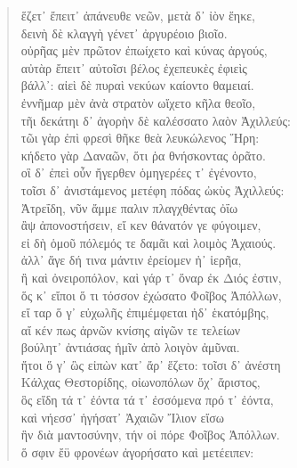 \begin{Spacing}{1.5}
\begin{verse}
{\large\g  ἕζετ᾽ ἔπειτ᾽ ἀπάνευθε νεῶν, μετὰ δ᾽ ἰὸν ἕηκε,  } \\
{\large\g  δεινὴ δὲ κλαγγὴ γένετ᾽ ἀργυρέοιο βιοῖο.  } \\
{\large\g  οὐρῆας μὲν πρῶτον ἐπωίχετο καὶ κύνας ἀργούς,  } \\
{\large\g  αὐτὰρ ἔπειτ᾽ αὐτοῖσι βέλος ἐχεπευκὲς ἐφιεὶς  } \\
{\large\g  βάλλ᾽: αἰεὶ δὲ πυραὶ νεκύων καίοντο θαμειαί.  } \\
{\large\g  ἐννῆμαρ μὲν ἀνὰ στρατὸν ωἴχετο κῆλα θεοῖο,  } \\
{\large\g  τῆι δεκάτηι δ᾽ ἀγορὴν δὲ καλέσσατο λαὸν Ἀχιλλεύς:  } \\
{\large\g  τῶι γὰρ ἐπὶ φρεσὶ θῆκε θεὰ λευκώλενος Ἥρη:  } \\
{\large\g  κήδετο γὰρ Δαναῶν, ὅτι ῥα θνήσκοντας ὁρᾶτο.  } \\
{\large\g  οἳ δ᾽ ἐπεὶ οὖν ἤγερθεν ὁμηγερέες τ᾽ ἐγένοντο,  } \\
{\large\g  τοῖσι δ᾽ ἀνιστάμενος μετέφη πόδας ὠκὺς Ἀχιλλεύς:  } \\
{\large\g  Ἀτρεΐδη, νῦν ἄμμε παλιν πλαγχθέντας ὀΐω  } \\
{\large\g  ἂψ ἀπονοστήσειν, εἴ κεν θάνατόν γε φύγοιμεν,  } \\
{\large\g  εἰ δὴ ὁμοῦ πόλεμός τε δαμᾶι καὶ λοιμὸς Ἀχαιούς.  } \\
{\large\g  ἀλλ᾽ ἄγε δή τινα μάντιν ἐρείομεν ἠ᾽ ἱερῆα,  } \\
{\large\g  ἢ καὶ ὀνειροπόλον, καὶ γάρ τ᾽ ὄναρ ἐκ Διός ἐστιν,  } \\
{\large\g  ὅς κ᾽ εἴποι ὅ τι τόσσον ἐχώσατο Φοῖβος Ἀπόλλων,  } \\
{\large\g  εἴ ταρ ὅ γ᾽ εὐχωλῆς ἐπιμέμφεται ἠδ᾽ ἑκατόμβης,  } \\
{\large\g  αἴ κέν πως ἀρνῶν κνίσης αἰγῶν τε τελείων  } \\
{\large\g  βούλητ᾽ ἀντιάσας ἡμῖν ἀπὸ λοιγὸν ἀμῦναι.  } \\
{\large\g  ἤτοι ὅ γ᾽ ὣς εἰπὼν κατ᾽ ἄρ᾽ ἕζετο: τοῖσι δ᾽ ἀνέστη  } \\
{\large\g  Κάλχας Θεστορίδης, οἰωνοπόλων ὄχ᾽ ἄριστος,  } \\
{\large\g  ὃς εἴδη τά τ᾽ ἐόντα τά τ᾽ ἐσσόμενα πρό τ᾽ ἐόντα,  } \\
{\large\g  καὶ νήεσσ᾽ ἡγήσατ᾽ Ἀχαιῶν Ἴλιον εἴσω  } \\
{\large\g  ἣν διὰ μαντοσύνην, τήν οἱ πόρε Φοῖβος Ἀπόλλων.  } \\
{\large\g  ὅ σφιν ἔϋ φρονέων ἀγορήσατο καὶ μετέειπεν:  } \\

\end{verse}
\end{Spacing}
